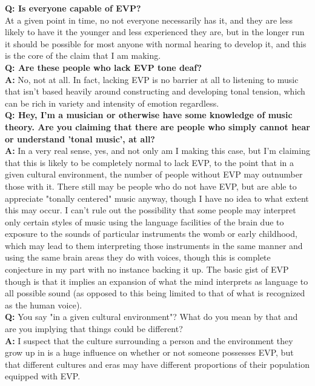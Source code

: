 \documentclass[]{article}
\begin{document}
\textbf{Q: Is everyone capable of EVP?}\\

At a given point in time, no not everyone necessarily has it, and they are less likely to have it the younger and less experienced they are, but in the longer run it should be possible for most anyone with normal hearing to develop it, and this is the core of the claim that I am making.\\

\textbf{Q: Are these people who lack EVP tone deaf?}\\

\textbf{A:} No, not at all. In fact, lacking EVP is no barrier at all to listening to music that isn't based heavily around constructing and developing tonal tension, which can be rich in variety and intensity of emotion regardless.\\

\textbf{Q: Hey, I'm a musician or otherwise have some knowledge of music theory. Are you claiming that there are people who simply cannot hear or understand 'tonal music', at all?}\\

\textbf{A:} In a very real sense, yes, and not only am I making this case, but I'm claiming that this is likely to be completely normal to lack EVP, to the point that in a given cultural environment, the number of people without EVP may outnumber those with it. There still may be people who do not have EVP, but are able to appreciate "tonally centered" music anyway, though I have no idea to what extent this may occur. I can't rule out the possibility that some people may interpret only certain styles of music using the language facilities of the brain due to exposure to the sounds of particular instruments the womb or early childhood, which may lead to them interpreting those instruments in the same manner and using the same brain areas they do with voices, though this is complete conjecture in my part with no instance backing it up. The basic gist of EVP though is that it implies an expansion of what the mind interprets as language to all possible sound (as opposed to this being limited to that of what is recognized as the human voice).\\

\textbf{Q:} You say "in a given cultural environment"? What do you mean by that and are you implying that things could be different?\\

\textbf{A:} I suspect that the culture surrounding a person and the environment they grow up in is a huge influence on whether or not someone possesses EVP, but that different cultures and eras may have different proportions of their population equipped with EVP.\\
\end{document}
